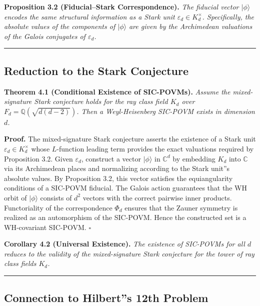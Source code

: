 \documentclass[12pt,a4paper]{article}
\begin{document}
\textbf{Proposition 3.2 (Fiducial--Stark Correspondence).} \emph{The fiducial vector $|\phi\rangle$ encodes the same structural information as a Stark unit $\varepsilon_d \in K_d^\times$. Specifically, the absolute values of the components of $|\phi\rangle$ are given by the Archimedean valuations of the Galois conjugates of $\varepsilon_d$.}

\begin{center}
\rule{0.5\textwidth}{0.4pt}
\end{center}

\subsection{Reduction to the Stark Conjecture}

\textbf{Theorem 4.1 (Conditional Existence of SIC-POVMs).} \emph{Assume the mixed-signature Stark conjecture holds for the ray class field $K_d$ over $F_d = \mathbb{Q}(\sqrt{d(d-2)})$. Then a Weyl-Heisenberg SIC-POVM exists in dimension $d$.}

\textbf{Proof.} The mixed-signature Stark conjecture asserts the existence of a Stark unit $\varepsilon_d \in K_d^\times$ whose $L$-function leading term provides the exact valuations required by Proposition 3.2. Given $\varepsilon_d$, construct a vector $|\phi\rangle$ in $\mathbb{C}^d$ by embedding $K_d$ into $\mathbb{C}$ via its Archimedean places and normalizing according to the Stark unit''s absolute values. By Proposition 3.2, this vector satisfies the equiangularity conditions of a SIC-POVM fiducial. The Galois action guarantees that the WH orbit of $|\phi\rangle$ consists of $d^2$ vectors with the correct pairwise inner products. Functoriality of the correspondence $\Phi_d$ ensures that the Zauner symmetry is realized as an automorphism of the SIC-POVM. Hence the constructed set is a WH-covariant SIC-POVM. $\square$

\textbf{Corollary 4.2 (Universal Existence).} \emph{The existence of SIC-POVMs for all $d$ reduces to the validity of the mixed-signature Stark conjecture for the tower of ray class fields $K_d$.}

\begin{center}
\rule{0.5\textwidth}{0.4pt}
\end{center}

\subsection{Connection to Hilbert''s 12th Problem}
\end{document}
